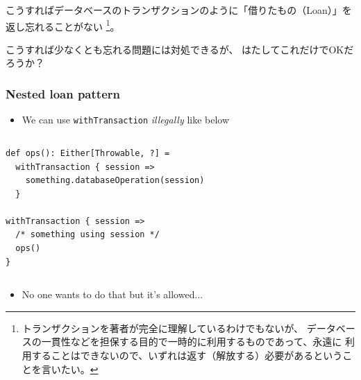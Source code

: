 \begin{frame}[fragile]
\begin{notes}
    \item こうすればデータベースのトランザクションのように「借りたもの（Loan）」を
    返し忘れることがない%
    \footnote{トランザクションを著者が完全に理解しているわけでもないが、%
    データベースの一貫性などを担保する目的で一時的に利用するものであって、永遠に%
    利用することはできないので、いずれは返す（解放する）必要があるということを言いたい。}。

    \item こうすれば少なくとも忘れる問題には対処できるが、
    はたしてこれだけでOKだろうか？
  \end{notes}
\end{frame}

\begin{frame}[fragile]
  \frametitle{Nested loan pattern}

  \pause
  \begin{itemize}
    \item<+-> We can use \lstinline|withTransaction| \emph{illegally} like below
  \end{itemize}

  \begin{columns}
    \begin{column}{0.5\textwidth}
\begin{lstlisting}[style=scala]
def ops(): Either[Throwable, ?] =
  withTransaction { session =>
    something.databaseOperation(session)
  }

withTransaction { session =>
  /* something using session */
  ops()
}
\end{lstlisting}
    \end{column}
    \begin{column}{0.5\textwidth}
    \end{column}
  \end{columns}

  \begin{itemize}
    \item<+-> No one wants to do that but it's allowed...


\end{itemize}
\end{frame}
